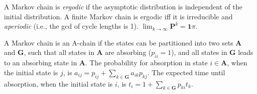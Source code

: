 A Markov chain is \emph{ergodic} if the asymptotic distribution is independent of the initial distribution.
A finite Markov chain is ergodic iff it is irreducible and \emph{aperiodic} (i.e., the gcd of cycle lengths is 1).
$\lim_{k\rightarrow\infty}\mathbf{P}^k = \mathbf{1}\pi$.

A Markov chain is an A-chain if the states can be partitioned into two sets $\mathbf{A}$ and $\mathbf{G}$, such that all states in $\mathbf{A}$ are absorbing ($p_{ii}=1$), and all states in $\mathbf{G}$ leads to an absorbing state in $\mathbf{A}$.
The probability for absorption in state $i\in\mathbf{A}$, when the initial state is $j$, is $a_{ij} = p_{ij}+\sum_{k\in\mathbf{G}} a_{ik}p_{kj}$.
The expected time until absorption, when the initial state is $i$, is $t_i = 1+\sum_{k\in\mathbf{G}}p_{ki}t_k$.

